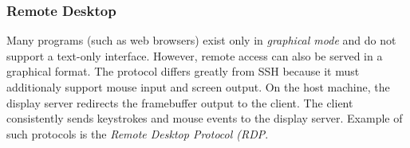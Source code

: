 \subsubsection{Remote Desktop}

Many programs (such as web browsers) exist only in \textit{graphical mode} and do not support a text-only interface.
However, remote access can also be served in a graphical format. The protocol differs greatly from SSH because
it must additionaly support mouse input and screen output. On the host machine, the display server redirects
the framebuffer output to the client. The client consistently sends keystrokes and mouse events to the display
server. Example of such protocols is the \textit{Remote Desktop Protocol (RDP}.
